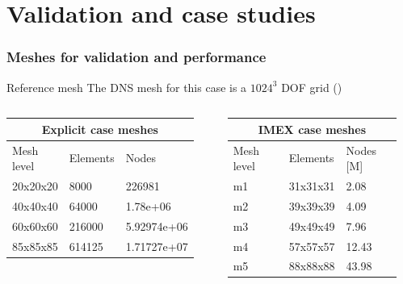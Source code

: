 \section{Validation and case studies}

\begin{frame}
    \frametitle{Meshes for validation and performance}
    \begin{block}{Reference mesh}
		The DNS mesh for this case is a $1024^3$ DOF grid (\cite{bib:lusherTgv})
    \end{block}
    \begin{columns}
        \begin{table}[H]
            \centering
            \begin{tabular}{|p{1.5cm}||p{1cm}|p{2cm}|}
                \hline
                \multicolumn{3}{|c|}{Explicit case meshes} \\
                \hline
                Mesh level&Elements&Nodes\\
                \hline
                20x20x20 & 8000 & 226981\\
                40x40x40 & 64000 & 1.78e+06\\
                60x60x60 & 216000 & 5.92974e+06\\
                85x85x85 & 614125 & 1.71727e+07\\
                \hline
            \end{tabular}
            \label{table:meshPerf}
        \end{table}
        \begin{table}[H]
            \centering
            \begin{tabular}{|p{1.5cm}||p{1.5cm}|p{1.5cm}|}
                \hline
                \multicolumn{3}{|c|}{IMEX case meshes} \\
                \hline
                Mesh level&Elements&Nodes [M]\\
                \hline
                m1   & 31x31x31 & 2.08 \\
                m2   & 39x39x39 & 4.09 \\
                m3   & 49x49x49 & 7.96 \\
                m4   & 57x57x57 & 12.43 \\
                m5   & 88x88x88 & 43.98 \\
                \hline
            \end{tabular}
            \label{table:meshPerf}
        \end{table}
    \end{columns}
\end{frame}

